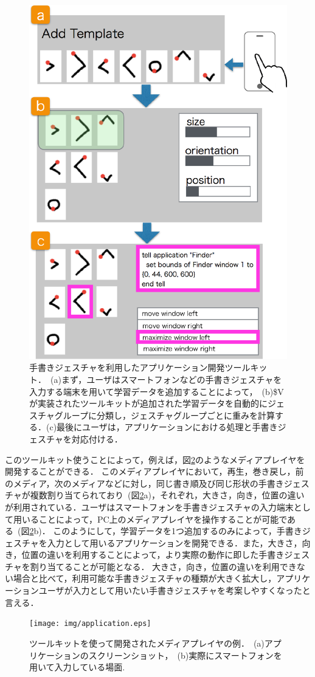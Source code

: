 \begin{figure} [h!]
	\begin{center}
		\includegraphics [width=0.7\hsize ]{img/flow.eps}
	\end{center}
	\caption{手書きジェスチャを利用したアプリケーション開発ツールキット．~(a)まず，ユーザはスマートフォンなどの手書きジェスチャを入力する端末を用いて学習データを追加することによって，~(b)\$Vが実装されたツールキットが追加された学習データを自動的にジェスチャグループに分類し，ジェスチャグループごとに重みを計算する．(c)最後にユーザは，アプリケーションにおける処理と手書きジェスチャを対応付ける．}
	\label{fig:flow}
\end{figure}

このツールキット使うことによって，例えば，図\ref{fig:application}のようなメディアプレイヤを開発することができる．
このメディアプレイヤにおいて，再生，巻き戻し，前のメディア，次のメディアなどに対し，同じ書き順及び同じ形状の手書きジェスチャが複数割り当てられており~(図\ref{fig:application}a)，それぞれ，大きさ，向き，位置の違いが利用されている．ユーザはスマートフォンを手書きジェスチャの入力端末として用いることによって，PC上のメディアプレイヤを操作することが可能である~(図\ref{fig:application}b)．
このようにして，学習データを1つ追加するのみによって，手書きジェスチャを入力として用いるアプリケーションを開発できる．また，大きさ，向き，位置の違いを利用することによって，より実際の動作に即した手書きジェスチャを割り当てることが可能となる．
大きさ，向き，位置の違いを利用できない場合と比べて，利用可能な手書きジェスチャの種類が大きく拡大し，アプリケーションユーザが入力として用いたい手書きジェスチャを考案しやすくなったと言える．

\begin{figure} [h!]
	\begin{center}
		\texttt{[image: img/application.eps]}
	\end{center}
	\caption{ツールキットを使って開発されたメディアプレイヤの例．~(a)アプリケーションのスクリーンショット，~(b)実際にスマートフォンを用いて入力している場面.
	}
	\label{fig:application}
\end{figure}
